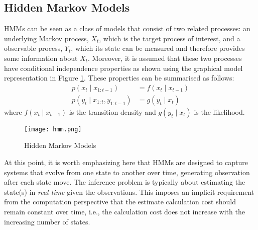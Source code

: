 \subsection{Hidden Markov Models}
HMMs can be seen as a class of models that consist of two related processes: an underlying Markov process, $X_t$, which is the target process of interest, and a observable process, $Y_t$, which its state can be measured and therefore provides some information about $X_t$. Moreover, it is assumed that these two processes have conditional independence properties as shown using the graphical model representation in Figure \ref{fig:HMM}. These properties can be summarised as follows:
\begin{align}
   p(x_t \mid x_{1:t-1}) &= f(x_t \mid x_{t-1})   \nonumber \\
   p(y_t \mid x_{1:t}, y_{1:t-1}) &= g(y_t \mid x_{t}) 
\end{align}
where $f(x_t \mid x_{t-1})$ is the transition density and $g(y_t \mid x_t)$ is the likelihood. 
\begin{figure}
\centering
\texttt{[image: hmm.png]} 
\caption{Hidden Markov Models}
\label{fig:HMM}
\end{figure}

At this point, it is worth emphasizing here that HMMs are designed to capture systems that evolve from one state to another over time, generating observation after each state move. The inference problem is typically about estimating the state(s) in \emph{real-time} given the observations. This imposes an implicit requirement from the computation perspective that the estimate calculation cost should remain constant over time, i.e., the calculation cost does not increase with the increasing number of states.

